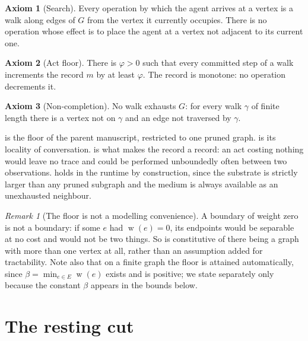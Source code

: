 \documentclass[11pt,a4paper]{article}
\theoremstyle{clstyle}
\theoremstyle{definition}
\newtheorem{axiom}{Axiom}
\theoremstyle{remark}
\newtheorem{remark}[theorem]{Remark}
\DeclareMathOperator{\wt}{w}
\newcommand{\flo}{\beta}
\newcommand{\rec}{m}
\newcommand{\traj}{\gamma}               %
\begin{document}
\begin{axiom}[Search]
\label{ax:search}
Every operation by which the agent arrives at a vertex is a walk along edges
of $G$ from the vertex it currently occupies. There is no operation whose
effect is to place the agent at a vertex not adjacent to its current one.
\end{axiom}

\begin{axiom}[Act floor]
\label{ax:actfloor}
There is $\varphi>0$ such that every committed step of a walk increments the
record $\rec$ by at least $\varphi$. The record is monotone: no operation
decrements it.
\end{axiom}

\begin{axiom}[Non-completion]
\label{ax:noncompletion}
No walk exhausts $G$: for every walk $\traj$ of finite length there is a
vertex not on $\traj$ and an edge not traversed by $\traj$.
\end{axiom}

 is the floor of the parent manuscript, restricted to one
pruned graph.  is its locality of conversation.
 is what makes the record a record: an act costing nothing
would leave no trace and could be performed unboundedly often between two
observations.  holds in the runtime by construction,
since the substrate is strictly larger than any pruned subgraph and the
medium is always available as an unexhausted neighbour.

\begin{remark}[The floor is not a modelling convenience]
\label{rem:floornotconvenience}
A boundary of weight zero is not a boundary: if some $e$ had $\wt(e)=0$, its
endpoints would be separable at no cost and would not be two things. So
 is constitutive of there being a graph with more than one
vertex at all, rather than an assumption added for tractability. Note also
that on a finite graph the floor is attained automatically, since
$\flo=\min_{e\in E}\wt(e)$ exists and is positive; we state
 separately only because the constant $\flo$ appears in the
bounds below.
\end{remark}

\section{The resting cut}
\label{sec:resting}
\end{document}
